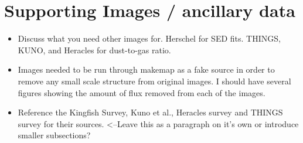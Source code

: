 \section{Supporting Images / ancillary data}

\begin{itemize}
  \item Discuss what you need other images for.  Herschel for SED fits.  THINGS, KUNO, and Heracles for dust-to-gas ratio.
  \item Images needed to be run through makemap as a fake source in order to remove any small scale structure from original images.  I should have several figures showing the amount of flux removed from each of the images.
  \item Reference the Kingfish Survey, Kuno et al., Heracles survey and THINGS survey for their sources.  <--Leave this as a paragraph on it's own or introduce smaller subsections?
  
\end{itemize}

